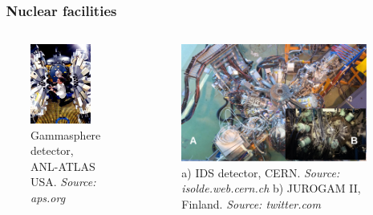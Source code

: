 \documentclass{beamer}
\begin{document}
\begin{frame}
	\frametitle{\faSearch\ Nuclear facilities}
	\begin{columns}
		\begin{figure}
		\centering
		\includegraphics[width=0.86\textwidth]{figures/gsfig.jpg}
		\caption{Gammasphere detector, ANL-ATLAS USA. \textit{Source: aps.org}}
	\end{figure}
	\begin{figure}
		\centering
		\includegraphics[width=0.98\textwidth]{figures/isolde_cern_2.png}
		\caption{a) IDS detector, CERN. \textit{Source: isolde.web.cern.ch} b) JUROGAM II, Finland. \textit{Source: twitter.com}}
		\end{figure}
	\end{columns}
\end{frame}
\end{document}
